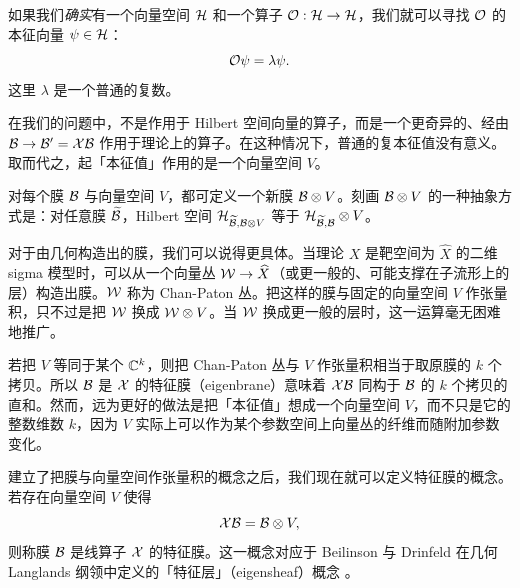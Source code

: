 如果我们{\it 确实}有一个向量空间 ${\cal H}$ 和一个算子 ${\EUO}:{\cal H}\to {\cal H}$，我们就可以寻找 ${\EUO}$ 的本征向量 $\psi\in
{\cal H}$：
\setcounter{equation}{20}
\begin{equation}\label{eq:reot}
{\EUO}\psi=\lambda\psi.
\end{equation}
 这里 $\lambda$ 是一个普通的复数。

在我们的问题中，不是作用于 Hilbert 空间向量的算子，而是一个更奇异的、经由 ${\cal B}\to {\cal B}'=\EUX {\cal B}$ 作用于理论上的算子。在这种情况下，普通的复本征值没有意义。取而代之，起「本征值」作用的是一个向量空间 $V$。

对每个膜 ${\cal B}$ 与向量空间 $V$，都可定义一个新膜 ${\cal B}\otimes V$。刻画 ${\cal B}\otimes V$ 的一种抽象方式是：对任意膜 $\tilde {\cal B}$，Hilbert 空间 ${\cal H}_{\tilde {\cal B},{\cal B}\otimes V}$ 等于 ${\cal H}_{\tilde {\cal B}, {\cal B}}\otimes V$。

对于由几何构造出的膜，我们可以说得更具体。当理论 $X$ 是靶空间为 $\hat X$ 的二维 sigma 模型时，可以从一个向量丛 ${\cal W}\to \hat X$（或更一般的、可能支撑在子流形上的层）构造出膜。${\cal
W}$ 称为 Chan-Paton 丛。把这样的膜与固定的向量空间 $V$ 作张量积，只不过是把 ${\cal W}$ 换成 ${\cal
W}\otimes V$。当 ${\cal W}$ 换成更一般的层时，这一运算毫无困难地推广。

若把 $V$ 等同于某个 $\Bbb{C}^k$，则把 Chan-Paton 丛与 $V$ 作张量积相当于取原膜的 $k$ 个拷贝。所以 ${\cal B}$ 是 $\EUX$ 的特征膜（eigenbrane）意味着 $\EUX{\cal B}$ 同构于 ${\cal B}$ 的 $k$ 个拷贝的直和。然而，远为更好的做法是把「本征值」想成一个向量空间 $V$，而不只是它的整数维数 $k$，因为 $V$ 实际上可以作为某个参数空间上向量丛的纤维而随附加参数变化。

建立了把膜与向量空间作张量积的概念之后，我们现在就可以定义特征膜的概念。若存在向量空间 $V$ 使得
\setcounter{equation}{21}
\begin{equation}\label{eq:intico}
\EUX {\cal B}={\cal B}\otimes V,
\end{equation}
 则称膜 ${\cal B}$ 是线算子 $\EUX$ 的特征膜。这一概念对应于 Beilinson 与 Drinfeld 在几何 Langlands 纲领中定义的「特征层」（eigensheaf）概念 \cite{ref5}。

